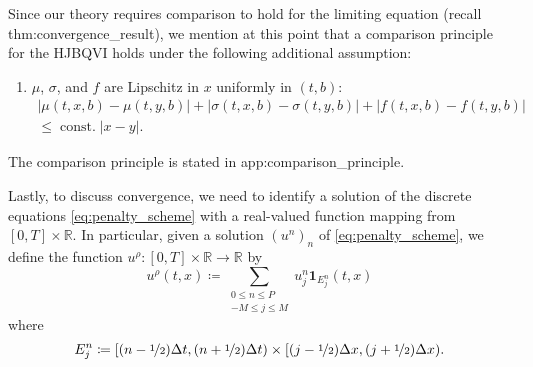 \documentclass[12pt]{article}
\begin{document}
Since our theory requires comparison to hold for the limiting equation
(recall {\prettyref}{thm:convergence_result}), we mention at this point
that a comparison principle for the HJBQVI holds under the following
additional assumption:
\begin{enumerate}[label=(H\arabic*),start=9]
\item \label{enu:lipschitz}$\mu$, $\sigma$, and $f$ are Lipschitz in
$x$ uniformly in $(t,b)$:
\begin{multline*}
\left|\mu(t,x,b)-\mu(t,y,b)\right|+\left|\sigma(t,x,b)-\sigma(t,y,b)\right|+\left|f(t,x,b)-f(t,y,b)\right|\\
{\leqslant}{\operatorname{const.}}\left|x-y\right|.
\end{multline*}
\end{enumerate}
The comparison principle is stated in {\prettyref}{app:comparison_principle}.

Lastly, to discuss convergence, we need to identify a solution of
the discrete equations \eqref{eq:penalty_scheme} with a real-valued
function mapping from $[0,T]\times\mathbb{R}$. In particular, given
a solution $(u^{n})_{n}$ of \eqref{eq:penalty_scheme}, we define
the function $u^{\rho}:[0,T]\times\mathbb{R}\rightarrow\mathbb{R}$
by
\[
u^{\rho}(t,x)\coloneqq\sum_{\substack{0{\leqslant} n{\leqslant} P\\
-M{\leqslant} j{\leqslant} M
}
}u_{j}^{n}\mathbf{1}_{E_{j}^{n}}(t,x)
\]
where
\begin{equation}
E_{j}^{n}\coloneqq[(n-\nicefrac{1}{2})\Delta t,(n+\nicefrac{1}{2})\Delta t)\times[(j-\nicefrac{1}{2})\Delta x,(j+\nicefrac{1}{2})\Delta x).\label{eq:domain_partition}
\end{equation}
\end{document}
